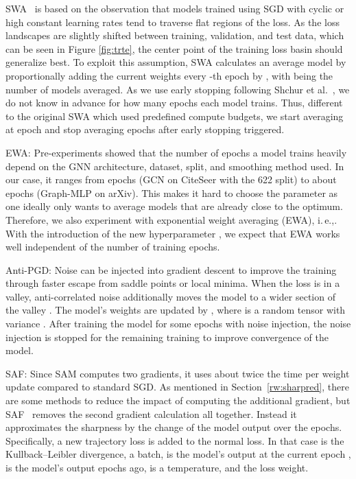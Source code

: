 \documentclass[runningheads]{llncs}
\newcommand{\ie}{i.\,e.,\xspace}
\newcommand{\GraphMLP}{Graph-MLP\xspace}
\begin{document}
SWA~\cite{swa} is based on the observation that models trained using SGD with cyclic or high constant learning rates tend to traverse flat regions of the loss.
As the loss landscapes are slightly shifted between training, validation, and test data, which can be seen in Figure \ref{fig:trte}, the center point of the training loss basin should generalize best.
To exploit this assumption, SWA calculates an average model  by proportionally adding the current weights every -th epoch by , with  being the number of models averaged. 
As we use early stopping following Shchur et al.~\cite{Shchur18pitfalls}, we do not know in advance for how many epochs each model trains.
Thus, different to the original SWA which used predefined compute budgets, we start averaging at epoch  and stop averaging  epochs after early stopping triggered.

EWA: 
Pre-experiments showed that the number of epochs a model trains heavily depend on the GNN architecture, dataset, split, and smoothing method used.
In our case, it ranges from  epochs (GCN on CiteSeer with the 622 split) to about  epochs (\GraphMLP on arXiv).
This makes it hard to choose the  parameter as one ideally only wants to average models that are already close to the optimum.
Therefore, we also experiment with exponential weight averaging (EWA), \ie .
With the introduction of the new hyperparameter , we expect that EWA works well independent of the number of training epochs.

Anti-PGD: Noise can be injected into gradient descent to improve the training through faster escape from saddle points or local minima.
When the loss is in a valley, anti-correlated noise additionally moves the model to a wider section of the valley \cite{orvieto2022anticorrelated}.
The model's weights are updated by , where  is a random tensor with variance .
After training the model for some epochs with noise injection, the noise injection is stopped for the remaining training to improve convergence of the model.


SAF: Since SAM computes two gradients, it uses about twice the time per weight update compared to standard SGD.
As mentioned in Section~\ref{rw:sharpred}, there are some methods to reduce the impact of computing the additional gradient, but SAF~\cite{SAF} removes the second gradient calculation all together.
Instead it approximates the sharpness by the change of the model output over the epochs.
Specifically, a new trajectory loss  is added to the normal loss.
In that case  is the Kullback–Leibler divergence,  a batch,  is the model's output at the current epoch ,  is the model's output  epochs ago,  is a temperature, and  the loss weight.
\end{document}

